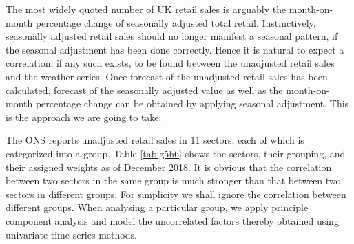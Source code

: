 \documentclass[a4paper,11pt,pdftex,twoside,titlepage]{article}
\begin{document}
The most widely quoted number of UK retail sales is arguably the
month-on-month percentage change of seasonally adjusted total
retail. Instinctively, seasonally adjusted retail sales should no
longer manifest a seasonal pattern, if the seasonal adjustment has
been done correctly. Hence it is natural to expect a correlation, if
any such exists, to be found between the unadjusted retail sales and
the weather series. Once forecast of the unadjusted retail sales has
been calculated, forecast of the seasonally adjusted value as well as
the month-on-month percentage change can be obtained by applying
seasonal adjustment. This is the approach we are going to take.

The ONS reports unadjusted retail sales in 11 sectors, each of which
is categorized into a group. Table \ref{tab:g5h6} shows the sectors,
their grouping, and their assigned weights as of December 2018. It is
obvious that the correlation between two sectors in the same group is
much stronger than that between two sectors in different groups. For
simplicity we shall ignore the correlation between different
groups. When analysing a particular group, we apply principle
component analysis and model the uncorrelated factors thereby obtained
using univariate time series methods.
\end{document}
